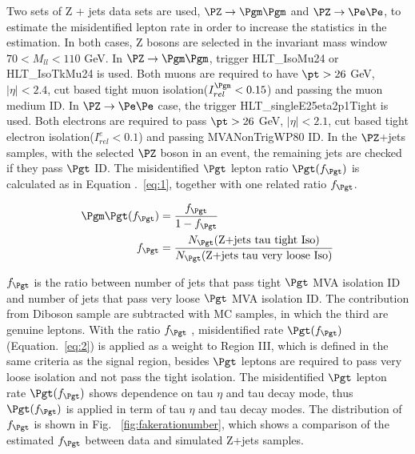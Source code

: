 
Two sets of Z + jets data sets are used, $\PZ \to \Pgm\Pgm$ and $\PZ\to \Pe \Pe$, to estimate the misidentified lepton rate in order to increase the statistics in the estimation.  In both cases, Z bosons are selected in the invariant mass window $70<M_{ll}<110$ GeV. In $\PZ\to\Pgm\Pgm$, trigger HLT\_IsoMu24 or HLT\_IsoTkMu24 is used. Both muons are required to have $\pt>26$ GeV, $|\eta|<2.4$, cut based tight muon isolation($I^{\Pgm}_{rel}<0.15$) and passing the muon medium ID. In $\PZ\to \Pe \Pe$ case, the trigger HLT\_singleE25eta2p1Tight is used. Both electrons are required to pass $\pt>26$ GeV, $|\eta|<2.1$, cut based tight electron isolation($I^{e}_{rel}<0.1$) and passing MVANonTrigWP80 ID. In the $\PZ$+jets samples, with the selected $\PZ$ boson in an event, the remaining jets are checked if they pass $\Pgt$ ID. The misidentified $\Pgt$ lepton ratio $\Pgt(f_{\Pgt})$ is calculated as in Equation .~\ref{eq:1}, together with one related ratio $f_{\Pgt}$.

\begin{align} 
\Pgm\Pgt(f_{\Pgt})&=\frac{f_{\Pgt}}{1-f_{\Pgt}} \label{eq:1}\\
f_{\Pgt}&=\frac{N_{\Pgt}(\textrm{Z+jets}\ \textrm{tau}\ \textrm{tight}\ \textrm{Iso})}{N_{\Pgt}(\textrm{Z+jets}\ \textrm{tau}\ \textrm{very}\ \textrm{loose}\ \textrm{Iso})} \label{eq:2}
\end{align}



$f_{\Pgt}$ is the ratio between number of jets that pass tight $\Pgt$ MVA isolation ID and number of jets that pass very loose $\Pgt$ MVA isolation ID. The contribution from Diboson sample are subtracted with MC samples, in which the third \Pgt are genuine leptons. With the ratio $f_{\Pgt}$ , misidentified rate $\Pgt(f_{\Pgt})$(Equation.~\ref{eq:2}) is applied as a weight to Region III, which is defined in the same criteria as the signal region, besides $\Pgt$ leptons are required to pass very loose isolation and not pass the tight isolation. The misidentified $\Pgt$ lepton rate $\Pgt(f_{\Pgt})$ shows dependence on tau $\eta$ and tau decay mode, thus $\Pgt(f_{\Pgt})$ is applied in term of tau $\eta$ and tau decay modes. The distribution of $f_{\Pgt}$ is shown in Fig.~ \ref{fig:fakerationumber}, which shows a comparison of the estimated $f_{\Pgt}$ between data and simulated Z+jets samples. 

